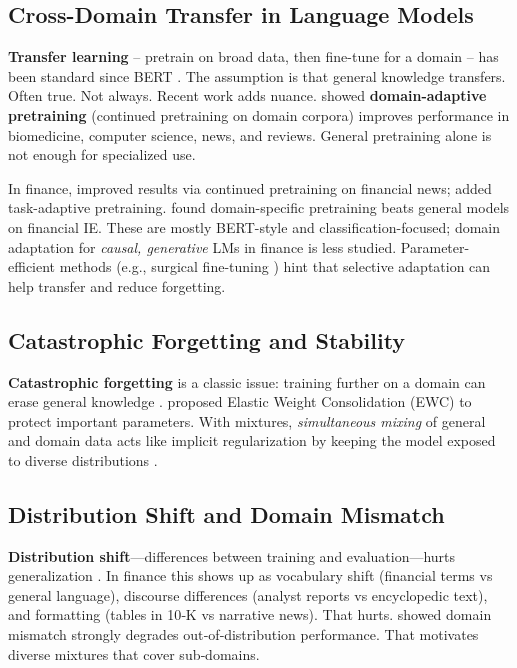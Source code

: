 \subsection{Cross-Domain Transfer in Language Models}

\textbf{Transfer learning} -- pretrain on broad data, then fine-tune for a domain -- has been standard since BERT \parencite{devlin2019bert,pan2010transfer,zhuang2020comprehensive}. The assumption is that general knowledge transfers. Often true. Not always. Recent work adds nuance. \textcite{gururangan2020don} showed \textbf{domain-adaptive pretraining} (continued pretraining on domain corpora) improves performance in biomedicine, computer science, news, and reviews. General pretraining alone is not enough for specialized use.

In finance, \textcite{araci2019finbert} improved results via continued pretraining on financial news; \textcite{yang2020finbert} added task-adaptive pretraining. \textcite{huang2023finbert} found domain-specific pretraining beats general models on financial IE. These are mostly BERT-style and classification-focused; domain adaptation for \textit{causal, generative} LMs in finance is less studied. Parameter-efficient methods (e.g., surgical fine-tuning \parencite{lee2022surgical}) hint that selective adaptation can help transfer and reduce forgetting.

\subsection{Catastrophic Forgetting and Stability}

\textbf{Catastrophic forgetting} is a classic issue: training further on a domain can erase general knowledge \parencite{mccloskey1989catastrophic, french1999catastrophic}. \textcite{kirkpatrick2017overcoming} proposed Elastic Weight Consolidation (EWC) to protect important parameters. With mixtures, \textit{simultaneous mixing} of general and domain data acts like implicit regularization by keeping the model exposed to diverse distributions \parencite{arivazhagan2019massively,raffel2020exploring}.

\subsection{Distribution Shift and Domain Mismatch}

\textbf{Distribution shift}—differences between training and evaluation—hurts generalization \parencite{quinonero2009dataset}. In finance this shows up as vocabulary shift (financial terms vs general language), discourse differences (analyst reports vs encyclopedic text), and formatting (tables in 10‑K vs narrative news). That hurts. \textcite{aharoni2020unsupervised} showed domain mismatch strongly degrades out‑of‑distribution performance. That motivates diverse mixtures that cover sub‑domains.

